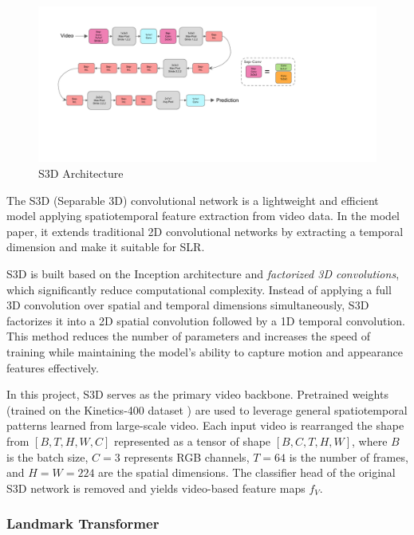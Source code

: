 \documentclass{article}
\begin{document}
\begin{figure}[H]
    \centering
    \includegraphics[width=1\linewidth]{Fig/s3dg.pdf}
    \caption{S3D Architecture}
    \label{fig:s3dmodel}
\end{figure}

The S3D (Separable 3D) convolutional network is a lightweight and efficient model applying spatiotemporal feature extraction from video data. In the model paper, it extends traditional 2D convolutional networks by extracting a temporal dimension and make it suitable for SLR.

\vspace{0.5cm}

S3D is built based on the Inception architecture and \textit{factorized 3D convolutions}, which significantly reduce computational complexity. Instead of applying a full 3D convolution over spatial and temporal dimensions simultaneously, S3D factorizes it into a 2D spatial convolution followed by a 1D temporal convolution. This method reduces the number of parameters and increases the speed of training while maintaining the model's ability to capture motion and appearance features effectively.

\vspace{0.5cm}

In this project, S3D serves as the primary video backbone. Pretrained weights (trained on the Kinetics-400 dataset \cite{kay2017kinetics}) are used to leverage general spatiotemporal patterns learned from large-scale video. Each input video is rearranged the shape from $[B, T, H, W, C]$ represented as a tensor of shape $[B, C, T, H, W]$, where $B$ is the batch size, $C = 3$ represents RGB channels, $T = 64$ is the number of frames, and $H = W = 224$ are the spatial dimensions. The classifier head of the original S3D network is removed and yields video-based feature maps $f_V$.

\subsubsection{Landmark Transformer}
\end{document}
